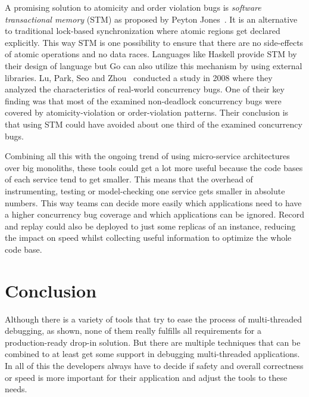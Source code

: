 \documentclass[conference]{IEEEtran}
\begin{document}
A promising solution to atomicity and order violation bugs is \emph{software transactional memory} (STM) as proposed by Peyton Jones~\cite{peytonjones2007beautiful}.
It is an alternative to traditional lock-based synchronization where atomic regions get declared explicitly.
This way STM is one possibility to ensure that there are no side-effects of atomic operations and no data races.
Languages like Haskell provide STM by their design of language but Go can also utilize this mechanism by using external libraries.
Lu, Park, Seo and Zhou~\cite{lu2008mistakes} conducted a study in 2008 where they analyzed the characteristics of real-world concurrency bugs.
One of their key finding was that most of the examined non-deadlock concurrency bugs were covered by atomicity-violation or order-violation patterns.
Their conclusion is that using STM could have avoided about one third of the examined concurrency bugs.

Combining all this with the ongoing trend of using micro-service architectures over big monoliths, these tools could get a lot more useful because the code bases of each service tend to get smaller.
This means that the overhead of instrumenting, testing or model-checking one service gets smaller in absolute numbers.
This way teams can decide more easily which applications need to have a higher concurrency bug coverage and which applications can be ignored.
Record and replay could also be deployed to just some replicas of an instance, reducing the impact on speed whilst collecting useful information to optimize the whole code base.


\section{Conclusion}
\label{sct:conclusion}

Although there is a variety of tools that try to ease the process of multi-threaded debugging, as shown, none of them really fulfills all requirements for a production-ready drop-in solution.
But there are multiple techniques that can be combined to at least get some support in debugging multi-threaded applications.
In all of this the developers always have to decide if safety and overall correctness or speed is more important for their application and adjust the tools to these needs.



\end{document}
